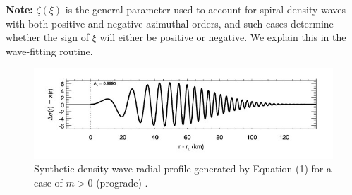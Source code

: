 \documentclass{article}
\begin{document}
\textbf{Note:} $\zeta(\xi)$ is the general parameter used to account for spiral density waves with both positive and negative azimuthal orders, and such cases determine whether the sign of $\xi$ will either be positive or negative. We explain this in the wave-fitting routine.

\begin{figure}[h] 
\centering 
\includegraphics[width=1.0\textwidth]{Linear_Density_WM.jpg}
\caption{Synthetic density-wave radial profile generated by Equation (1) for a case of $m>0$ (prograde) \cite{Tiscareno_2007}.} \label{fig:my_label}
\end{figure}





\end{document}

